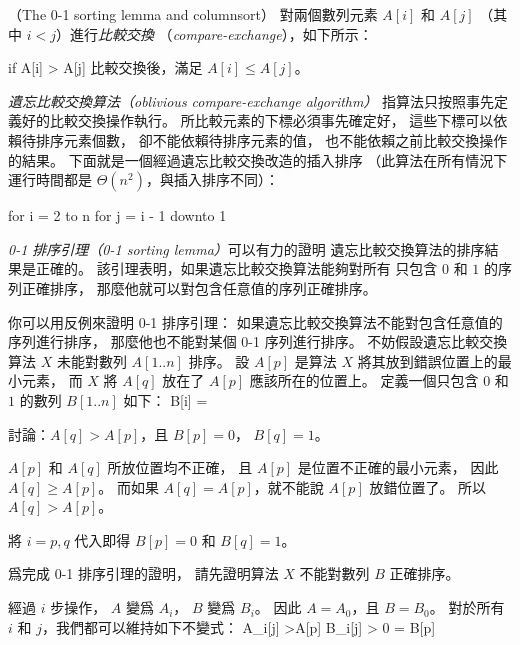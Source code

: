 \startPROBLEM
（The 0-1 sorting lemma and columnsort）
對兩個數列元素 $A[i]$ 和 $A[j]$ （其中 $i < j$）進行\emph{比較交換}
（\emph{compare-exchange}），如下所示：

\startCLRSCODE
if A[i] > A[j]
\stopCLRSCODE
比較交換後，滿足 $A[i] \le A[j]$。

\emph{遺忘比較交換算法（oblivious compare-exchange algorithm）}
指算法只按照事先定義好的比較交換操作執行。
所比較元素的下標必須事先確定好，
這些下標可以依賴待排序元素個數，
卻不能依賴待排序元素的值，
也不能依賴之前比較交換操作的結果。
下面就是一個經過遺忘比較交換改造的插入排序
（此算法在所有情況下運行時間都是 $\Theta(n^2)$，與插入排序不同）：

\startCLRSCODE
for i = 2 to n
	for j = i - 1 downto 1
\stopCLRSCODE

\emph{0-1 排序引理（0-1 sorting lemma）}可以有力的證明
遺忘比較交換算法的排序結果是正確的。
該引理表明，如果遺忘比較交換算法能夠對所有
只包含 $0$ 和 $1$ 的序列正確排序，
那麼他就可以對包含任意值的序列正確排序。

你可以用反例來證明 0-1 排序引理：
如果遺忘比較交換算法不能對包含任意值的序列進行排序，
那麼他也不能對某個 0-1 序列進行排序。
不妨假設遺忘比較交換算法 $X$ 未能對數列 $A[1..n]$ 排序。
設 $A[p]$ 是算法 $X$ 將其放到錯誤位置上的最小元素，
而 $X$ 將 $A[q]$ 放在了 $A[p]$ 應該所在的位置上。
定義一個只包含 $0$ 和 $1$ 的數列 $B[1..n]$ 如下：
\startformula
B[i] = \startmathcases
{} \NC {} \NR
{} \NC {} \NR
\stopmathcases
\stopformula

\startigBase[a]\startitem
討論：$A[q]>A[p]$，且 $B[p]=0$， $B[q]=1$。
\stopitem\stopigBase

\startANSWER
$A[p]$ 和 $A[q]$ 所放位置均不正確，
且 $A[p]$ 是位置不正確的最小元素，
因此 $A[q] \ge A[p]$。
而如果 $A[q]=A[p]$，就不能說 $A[p]$ 放錯位置了。
所以 $A[q] > A[p]$。

將 $i=p,q$ 代入即得 $B[p]=0$ 和 $B[q]=1$。
\stopANSWER

\startigBase[a,continue]\startitem
爲完成 0-1 排序引理的證明，
請先證明算法 $X$ 不能對數列 $B$ 正確排序。
\stopitem\stopigBase

\startANSWER
經過 $i$ 步操作， $A$ 變爲 $A_i$， $B$ 變爲 $B_i$。
因此 $A=A_0$，且 $B=B_0$。
對於所有 $i$ 和 $j$，我們都可以維持如下不變式：
\startformula
A_i[j] >A[p] \Leftrightarrow B_i[j] > 0 = B[p]
\stopformula

